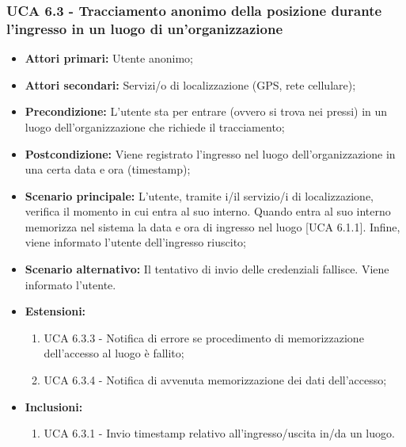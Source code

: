 \subsubsection{UCA 6.3 - Tracciamento anonimo della posizione durante l'ingresso in un luogo di un'organizzazione}%
\begin{itemize}
	\item \textbf{Attori primari:} Utente anonimo;
	\item \textbf{Attori secondari:} Servizi/o di localizzazione (GPS, rete cellulare);
	\item \textbf{Precondizione:} L'utente sta per entrare (ovvero si trova nei pressi) in un luogo dell'organizzazione che richiede il tracciamento;
	\item \textbf{Postcondizione:} Viene registrato l'ingresso nel luogo dell'organizzazione in una certa data e ora (timestamp);
	\item \textbf{Scenario principale:} L'utente, tramite i/il servizio/i di localizzazione, verifica il momento in cui entra al suo interno. Quando entra al suo interno memorizza nel sistema la data e ora di ingresso nel luogo [UCA 6.1.1]. Infine, viene informato l'utente dell'ingresso riuscito;
	\item \textbf{Scenario alternativo:} Il tentativo di invio delle credenziali fallisce. Viene informato l'utente.
	\item \textbf{Estensioni:}
	\begin{enumerate}
		\item UCA 6.3.3 - Notifica di errore se procedimento di memorizzazione dell'accesso al luogo è fallito;
		\item UCA 6.3.4 - Notifica di avvenuta memorizzazione dei dati dell'accesso;
	\end{enumerate}
	\item \textbf{Inclusioni:}
	\begin{enumerate}
		\item UCA 6.3.1 - Invio timestamp relativo all'ingresso/uscita in/da un luogo.
	\end{enumerate}
\end{itemize}

